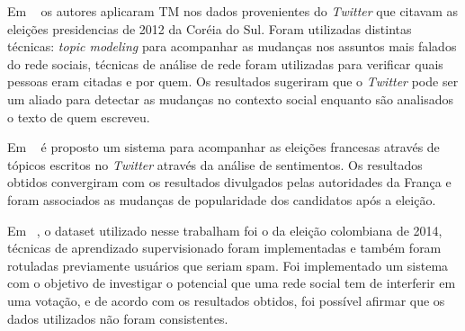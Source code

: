 Em ~\cite{song2014analyzing} os autores aplicaram \acrshort{TM} nos dados provenientes do \textit{Twitter} que citavam as eleições presidencias de 2012 da Coréia do Sul. 
Foram utilizadas distintas técnicas: \textit{topic modeling} para acompanhar as mudanças nos assuntos mais falados do rede sociais, técnicas de análise de rede 
foram utilizadas para verificar quais pessoas eram citadas e por quem. Os resultados sugeriram que o \textit{Twitter} pode ser um aliado para detectar as mudanças no 
contexto social enquanto são analisados o texto de quem escreveu.


Em  ~\cite{wegrzyn2012tweets} é proposto um sistema para acompanhar as eleições francesas através de tópicos escritos no \textit{Twitter} através da análise de sentimentos.
Os resultados obtidos convergiram com os resultados divulgados pelas autoridades da França e foram associados as mudanças de popularidade dos candidatos após a eleição.




Em ~\cite{guzman}, o dataset utilizado nesse trabalham foi o da eleição colombiana de 2014, técnicas de aprendizado supervisionado foram implementadas e também foram rotuladas
previamente usuários que seriam spam. Foi implementado um sistema com o objetivo de investigar o potencial que uma rede social tem de interferir em uma votação, e de acordo com 
os resultados obtidos, foi possível afirmar que os dados utilizados não foram consistentes.

